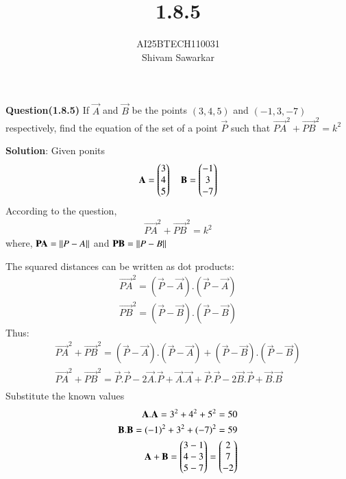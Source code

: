 \documentclass[journal]{IEEEtran}
\begin{document}

\vspace{3cm}

\title{1.8.5}
\author{AI25BTECH110031 \\ Shivam Sawarkar}
 \maketitle
{\let\newpage\relax\maketitle}

\renewcommand{\thefigure}{\theenumi}
\renewcommand{\thetable}{\theenumi}
\setlength{\intextsep}{10pt} %


\renewcommand{\thetable}{\theenumi}

\textbf{Question(1.8.5)}
If $\vec{A}$ and $\vec{B}$ be the points $(3,4,5)$ and $(-1,3,-7)$ respectively, find the equation of the set of a point $\vec{P}$ such that $\vec{PA}^2+\vec{PB}^2=k^2$

\textbf{Solution}:
Given ponits 
\begin{align}
    \mathbf{A}=\begin{pmatrix}3 \\ 4 \\ 5\end{pmatrix} \quad \mathbf{B}=\begin{pmatrix}-1 \\ 3 \\ -7\end{pmatrix}
\end{align}
According to the question,  
\begin{align}
    \vec{PA}^2+\vec{PB}^2=k^2
\end{align}
where, $\mathbf{PA}=\left\lVert P-A\right\rVert$ and $\mathbf{PB}=\left\lVert P-B\right\rVert$

The squared distances can be written as dot products:
\begin{align}
    \vec{PA}^2=(\vec{P}-\vec{A}).(\vec{P}-\vec{A}) \\
    \vec{PB}^2=(\vec{P}-\vec{B}).(\vec{P}-\vec{B})
\end{align}
Thus:
\begin{align}
    \vec{PA}^2+\vec{PB}^2=(\vec{P}-\vec{A}).(\vec{P}-\vec{A})+(\vec{P}-\vec{B}).(\vec{P}-\vec{B}) \\
    \vec{PA}^2+\vec{PB}^2=\vec{P}.\vec{P}-2\vec{A}.\vec{P}+\vec{A}.\vec{A}+\vec{P}.\vec{P}-2\vec{B}.\vec{P}+\vec{B}.\vec{B}\\
\end{align}
Substitute the known values
\begin{align}
    \mathbf{A}.\mathbf{A}=3^2+4^2+5^2=50 \\
    \mathbf{B}.\mathbf{B}=(-1)^2+3^2+(-7)^2=59 \\
    \mathbf{A}+\mathbf{B}=\begin{pmatrix}3-1 \\ 4-3 \\ 5-7\end{pmatrix}=\begin{pmatrix}2 \\ 7 \\ -2\end{pmatrix}
\end{align}
\end{document}
